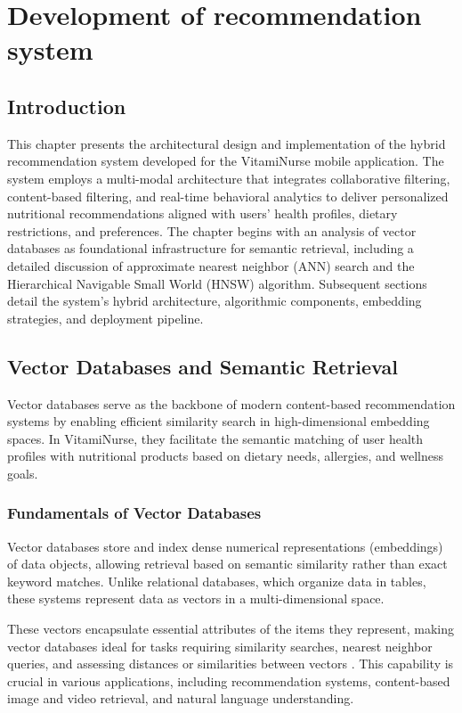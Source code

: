 \chapter{Development of recommendation system}
\section*{Introduction}
This chapter presents the architectural design and implementation of the hybrid recommendation system
developed for the VitamiNurse mobile application. The system employs
a multi-modal architecture that integrates collaborative filtering, content-based filtering, and real-time behavioral analytics to deliver personalized
nutritional recommendations aligned with users’ health profiles, dietary
restrictions, and preferences. The chapter begins with an analysis of vector databases as foundational
infrastructure for semantic retrieval, including a detailed discussion of approximate nearest neighbor (ANN) search and the Hierarchical Navigable
Small World (HNSW) algorithm. Subsequent sections detail the system’s hybrid architecture, algorithmic components, embedding strategies, and
deployment pipeline.


\section{Vector Databases and Semantic Retrieval}
Vector databases serve as the backbone of modern content-based recommendation systems by enabling efficient similarity search in high-dimensional embedding spaces. In VitamiNurse, they facilitate the semantic matching of user health profiles with nutritional products based on dietary needs, allergies, and wellness goals.

\subsection{Fundamentals of Vector Databases}
Vector databases store and index dense numerical representations (embeddings) of data objects, allowing retrieval based on semantic similarity rather than exact keyword matches. 
Unlike relational databases, which organize data in tables, these systems represent data as vectors in a multi-dimensional space. 

\par These vectors encapsulate essential attributes of the items they represent, 
making vector databases ideal for tasks requiring similarity searches, nearest neighbor queries, and assessing distances or similarities between vectors \cite{IBMVectordb2025}. 
This capability is crucial in various applications, including recommendation systems, content-based image and video retrieval, and natural language understanding.

